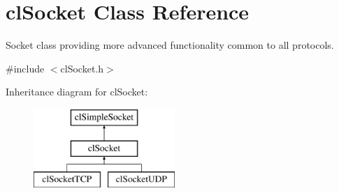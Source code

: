 \hypertarget{classcl_socket}{
\section{clSocket Class Reference}
\label{classcl_socket}
}


Socket class providing more advanced functionality common to all protocols.  




{\ttfamily \#include $<$clSocket.h$>$}

Inheritance diagram for clSocket:\begin{figure}[H]
\begin{center}
\leavevmode
\includegraphics[height=3.000000cm]{classcl_socket}
\end{center}
\end{figure}

